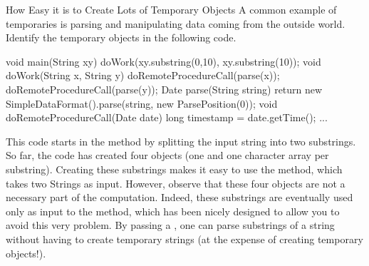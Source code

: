 
\begin{example}{How Easy it is to Create Lots of Temporary Objects}
A common example of temporaries is parsing
and manipulating data coming from the outside world. Identify the temporary
objects in the following code.

\begin{shortlisting}%
void main(String xy) {
	doWork(xy.substring(0,10), xy.substring(10));
}	
void doWork(String x, String y) {
	doRemoteProcedureCall(parse(x));
	doRemoteProcedureCall(parse(y));
}
Date parse(String string) {
	return new SimpleDataFormat().parse(string, new ParsePosition(0));
}
void doRemoteProcedureCall(Date date) {
	long timestamp = date.getTime();
	...
}
\end{shortlisting}
\end{example} 

This code starts in the  method by splitting the input string into two
substrings. So far, the code has created four objects (one  and one
character array per substring). Creating these substrings makes it easy to use
the  method, which takes two Strings as input. However, observe that
these four objects are not a necessary part of the computation. Indeed, these
substrings are eventually used only as input to the 
 method, which has been nicely designed to allow you to avoid this
very problem. By passing a , one can parse substrings of a
string without having to create temporary strings (at the expense of creating
temporary  objects!).




